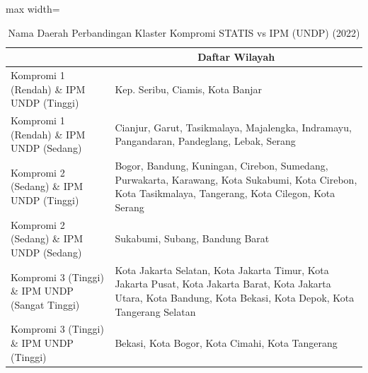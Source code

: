 \begin{table}[H]
\centering
\caption{Nama Daerah Perbandingan Klaster Kompromi STATIS vs IPM (UNDP) (2022)} \label{tab:app1comp_ipm_name_2022}
\begin{adjustbox}{max width=\textwidth}
\begin{tabular}{|>{\centering\arraybackslash}p{4cm}|p{10cm}|}
\hline
\multicolumn{1}{|c|}{\textbf{Kategori}} & \multicolumn{1}{c|}{\textbf{Daftar Wilayah}} \\
\hline
Kompromi 1 (Rendah) \& IPM UNDP (Tinggi) & Kep. Seribu, Ciamis, Kota Banjar \\
\hline
Kompromi 1 (Rendah) \& IPM UNDP (Sedang) & Cianjur, Garut, Tasikmalaya, Majalengka, Indramayu, Pangandaran, Pandeglang, Lebak, Serang \\
\hline
Kompromi 2 (Sedang) \& IPM UNDP (Tinggi) & Bogor, Bandung, Kuningan, Cirebon, Sumedang, Purwakarta, Karawang, Kota Sukabumi, Kota Cirebon, Kota Tasikmalaya, Tangerang, Kota Cilegon, Kota Serang \\
\hline
Kompromi 2 (Sedang) \& IPM UNDP (Sedang) & Sukabumi, Subang, Bandung Barat \\
\hline
Kompromi 3 (Tinggi) \& IPM UNDP (Sangat Tinggi) & Kota Jakarta Selatan, Kota Jakarta Timur, Kota Jakarta Pusat, Kota Jakarta Barat, Kota Jakarta Utara, Kota Bandung, Kota Bekasi, Kota Depok, Kota Tangerang Selatan \\
\hline
Kompromi 3 (Tinggi) \& IPM UNDP (Tinggi) & Bekasi, Kota Bogor, Kota Cimahi, Kota Tangerang \\
\hline
\end{tabular}
\end{adjustbox}
\end{table}